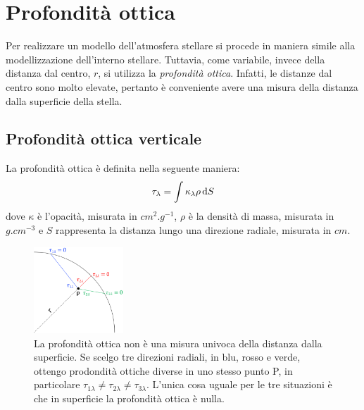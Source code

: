 \section{Profondità ottica}\label{sec:profondità-ottica}
Per realizzare un modello dell'atmosfera stellare si procede in maniera simile alla modellizzazione dell'interno stellare. Tuttavia, come variabile, invece della distanza dal centro, $r$, si utilizza la \emph{profondità ottica}. Infatti, le distanze dal centro sono molto elevate, pertanto è conveniente avere una misura della distanza dalla superficie della stella. 

\subsection{Profondità ottica verticale}
La profondità ottica è definita nella seguente maniera:
\begin{equation}\label{eq:profondità-ottica-atmosfera}
    \tau_\lambda = \int \kappa_\lambda \rho \mathop{}\!\mathrm{d} S
\end{equation}
dove $\kappa$ è l'opacità, misurata in $\si{cm^2.g^{-1}}$, $\rho$ è la densità di massa, misurata in $\si{g.cm^{-3}}$ e $S$ rappresenta la distanza lungo una direzione radiale, misurata in $\si{cm}$.

\begin{figure}
    \centering
    \includegraphics[width=0.3\textwidth]{immagini/profondita-ottica-atmosfera.png}
    \caption{La profondità ottica non è una misura univoca della distanza dalla superficie. Se scelgo tre direzioni radiali, in blu, rosso e verde, ottengo prodondità ottiche diverse in uno stesso punto P, in particolare $\tau_{1\lambda} \neq \tau_{2\lambda} \neq \tau_{3\lambda}$. L'unica cosa uguale per le tre situazioni è che in superficie la profondità ottica è nulla.}
    \label{fig:profondità-ottica-atmosfera}
\end{figure}


